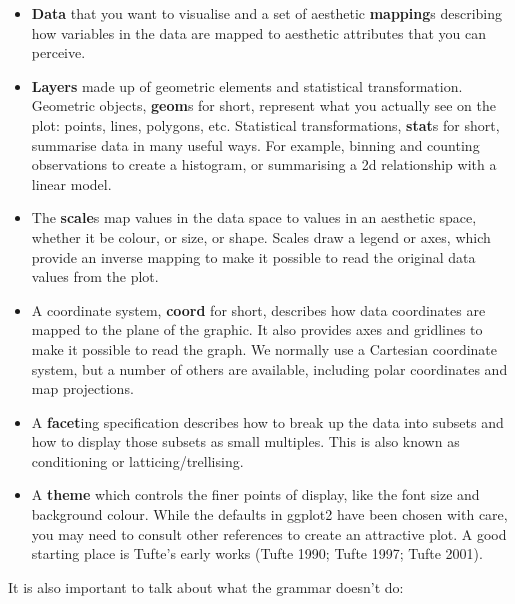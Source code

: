 \begin{itemize}
\item
  \textbf{Data} that you want to visualise and a set of aesthetic
  \textbf{mapping}s describing how variables in the data are mapped to
  aesthetic attributes that you can perceive.
\item
  \textbf{Layers} made up of geometric elements and statistical
  transformation. Geometric objects, \textbf{geom}s for short, represent
  what you actually see on the plot: points, lines, polygons, etc.
  Statistical transformations, \textbf{stat}s for short, summarise data
  in many useful ways. For example, binning and counting observations to
  create a histogram, or summarising a 2d relationship with a linear
  model.
\item
  The \textbf{scale}s map values in the data space to values in an
  aesthetic space, whether it be colour, or size, or shape. Scales draw
  a legend or axes, which provide an inverse mapping to make it possible
  to read the original data values from the plot.
\item
  A coordinate system, \textbf{coord} for short, describes how data
  coordinates are mapped to the plane of the graphic. It also provides
  axes and gridlines to make it possible to read the graph. We normally
  use a Cartesian coordinate system, but a number of others are
  available, including polar coordinates and map projections.
\item
  A \textbf{facet}ing specification describes how to break up the data
  into subsets and how to display those subsets as small multiples. This
  is also known as conditioning or latticing/trellising.
\item
  A \textbf{theme} which controls the finer points of display, like the
  font size and background colour. While the defaults in ggplot2 have
  been chosen with care, you may need to consult other references to
  create an attractive plot. A good starting place is Tufte's early
  works (Tufte 1990; Tufte 1997; Tufte 2001).
\end{itemize}

It is also important to talk about what the grammar doesn't do:

